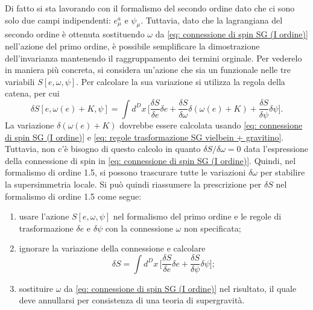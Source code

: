 Di fatto si sta lavorando con il formalismo del secondo ordine dato che ci sono solo due campi indipendenti: $e^a_\mu$ e $\psi_\mu$. Tuttavia, dato che la lagrangiana del secondo ordine è ottenuta sostituendo $\omega$ da \eqref{eq: connessione di spin SG (I ordine)} nell'azione del primo ordine, è possibile semplificare la dimostrazione dell'invarianza mantenendo il raggruppamento dei termini orginale. Per vederelo in maniera più concreta, si considera un'azione che sia un funzionale nelle tre variabili $S[e,\omega,\psi]$. Per calcolare la sua variazione si utilizza la regola della catena, per cui 
\begin{equation}
    \delta S[e,\omega(e) + K,\psi] = \int d^Dx\,\bigg[\frac{\delta S}{\delta e}\delta e + \frac{\delta S}{\delta \omega}\delta(\omega(e) + K) + \frac{\delta S}{\delta \psi}\delta\psi\bigg].
\end{equation}
La variazione $\delta(\omega(e) + K)$ dovrebbe essere calcolata usando \eqref{eq: connessione di spin SG (I ordine)} e \eqref{eq: regole trasformazione SG vielbein + gravitino}. Tuttavia, non c'è bisogno di questo calcolo in quanto $\delta S/\delta \omega = 0$ data l'espressione della connessione di spin in \eqref{eq: connessione di spin SG (I ordine)}. Quindi, nel formalismo di ordine 1.5, si possono trascurare tutte le variazioni $\delta\omega$ per stabilire la supersimmetria locale. Si può quindi riassumere la prescrizione per $\delta S$ nel formalismo di ordine 1.5 come segue:
\begin{enumerate}
    \item usare l'azione $S[e,\omega,\psi]$ nel formalismo del primo ordine e le regole di trasformazione $\delta e$ e $\delta\psi$ con la connessione $\omega$ non specificata;
    \item ignorare la variazione della connessione e calcolare 
    \begin{equation}
        \delta S = \int d^Dx\,\bigg[\frac{\delta S}{\delta e}\delta e + \frac{\delta S}{\delta \psi}\delta\psi\bigg];    
    \end{equation}
    \item sostituire $\omega$ da \eqref{eq: connessione di spin SG (I ordine)} nel risultato, il quale deve annullarsi per consistenza di una teoria di supergravità.
\end{enumerate} 

